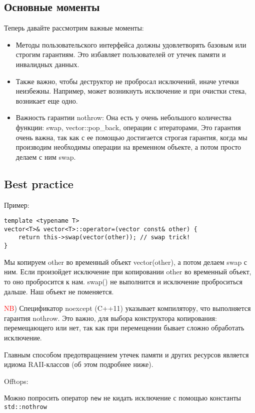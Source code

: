 \subsection{Основные моменты}

Теперь давайте рассмотрим важные моменты:
\begin{itemize}
\item Методы пользовательского интерфейса должны удовлетворять базовым или строгим гарантиям. Это избавляет пользователей от утечек памяти и инвалидных данных.

\item Также важно, чтобы деструктор не пробросал исключений, иначе утечки неизбежны. Например, может возникнуть исключение и при очистки стека, возникает еще одно.

\item Важность гарантии nothrow:
Она есть у очень небольшого количества функции: swap, vector::pop\_back, операции с итераторами, Это гарантия очень важна, так как с ее помощью достигается строгая гарантия, когда мы производим необходимы операции на временном объекте, а потом просто делаем с ним swap.
\end{itemize}

\subsection{Best practice}

Пример:
\begin{verbatim}
template <typename T>
vector<T>& vector<T>::operator=(vector const& other) {
    return this->swap(vector(other)); // swap trick!
}
\end{verbatim}

Мы копируем other во временный объект vector(other), а потом делаем swap с ним. Если произойдет исключение при копировании other во временный объект, то оно пробросится к нам. swap() не выполнится и исключение проброситься дальше. Наш объект не поменяется.

\textcolor{red}{NB}) Спецификатор noexcept (C++11) указывает компилятору, что выполняется гарантия nothrow. Это важно, для выбора конструктора копирования: перемещающего или нет, так как при перемещении бывает сложно обработать исключение.

Главным способом предотвращением утечек памяти и других ресурсов является идиома RAII-классов (об этом подробнее ниже).

Offtops:

Можно попросить оператор \texttt{new} не кидать исключение с помощью константы \texttt{std::nothrow}

